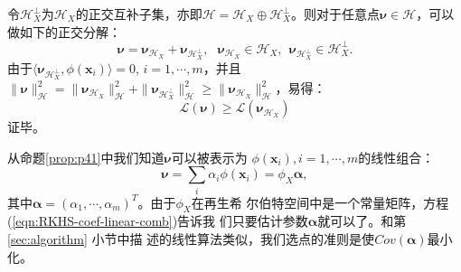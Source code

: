 \begin{zjuproof}
令$\mathcal{H}_X^{\perp}$为$\mathcal{H}_X$的正交互补子集，亦即$\mathcal{H}=\mathcal{H}_X \oplus
\mathcal{H}_X^{\perp}$。则对于任意点$\pmb{\nu} \in
\mathcal{H}$，可以做如下的正交分解：
$$
\pmb{\nu}=\pmb{\nu}_{\mathcal{H}_X}+\pmb{\nu}_{\mathcal{H}_X^{\perp}},
\ \ \ \pmb{\nu}_{\mathcal{H}_X} \in \mathcal{H}_X, \ \
\pmb{\nu}_{\mathcal{H}_X^{\perp}} \in \mathcal{H}_X^{\perp}.
$$
由于$\langle \pmb{\nu}_{\mathcal{H}_X^{\perp}}, \phi(\textbf{x}_i)
\rangle=0$, $i=1, \cdots, m$，并且$\| \pmb{\nu} \|^2_{\mathcal{H}} =
\| \pmb{\nu}_{\mathcal{H}_X}\|^2_{\mathcal{H}} +
\|\pmb{\nu}_{\mathcal{H}_X^{\perp}}\|^2_{\mathcal{H}} \geq \|
\pmb{\nu}_{\mathcal{H}_X}\|^2_{\mathcal{H}}$，易得：
$$
\mathcal{L}(\pmb{\nu})\geq \mathcal{L}(\pmb{\nu}_{\mathcal{H}_X})
$$
证毕。
\end{zjuproof}
从命题\ref{prop:p41}中我们知道$\pmb{\nu}$可以被表示为
$\phi(\mathbf{x}_i), i=1, \cdots, m$的线性组合：
\begin{equation}\label{eqn:RKHS-coef-linear-comb}
\pmb{\nu}=\sum_i \alpha_i \phi(\textbf{x}_i) = \phi_X \pmb{\alpha},
\end{equation}
其中$\pmb{\alpha}=(\alpha_1, \cdots, \alpha_m)^T$。由于$\phi_X$在再生希
尔伯特空间中是一个常量矩阵，方程(\ref{eqn:RKHS-coef-linear-comb})告诉我
们只要估计参数$\pmb{\alpha}$就可以了。和第 \ref{sec:algorithm} 小节中描
述的线性算法类似，我们选点的准则是使$Cov(\pmb{\alpha})$最小化。

